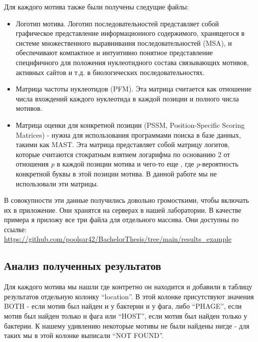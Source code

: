 \documentclass[14pt]{extarticle}
\begin{document}
    \par{Для каждого мотива также были получены следущие файлы: }
    
    \begin{itemize}
    \item Логотип мотива. Логотип последовательностей представляет собой графическое представление информационного
    содержимого, хранящегося в системе множественного выравнивания последовательностей (MSA), и обеспечивают
    компактное и интуитивно понятное представление специфичного для положения нуклеотидного состава связывающих
    мотивов, активных сайтов и т.д. в биологических последовательностях.
   
    \item Матрица частоты нуклеотидов (PFM). Эта матрица считается как отношение числа вхождений каждого нуклеотида в каждой позиции и полного числа мотивов. 
    
    \item Матрица оценки для конкретной позиции (PSSM, Position-Specific Scoring Matrices) - нужна для использования программами поиска в базе данных, такими как MAST. Эта матрица представляет собой матрицу логитов, которые считаются стократным взятием логарифма по основанию 2 от отношения \textit{p} в каждой позиции мотива и чего-то еще \cite{memeres}, где \textit{p}-вероятность конкретной буквы в этой позиции мотива. В данной работе мы не использовали эти матрицы.  
    \end{itemize}
    
    \par{В совокупности эти данные получились довольно громосткими, чтобы включать их в приложение. Они хранятся на серверах в нашей лаборатории. В качестве примера я приложу все три файла для отдельного массива. Они доступны по ссылке: \url{https://github.com/poolsar42/BachelorThesis/tree/main/results_example}}
    
    \begin{center}
    \subsection{Анализ полученных результатов}
    \end{center}
    
    \par{Для каждого мотива мы нашли где контретно он находится и добавили в таблицу результатов
    отдельную колонку ``location''. В этой колонке присутствуют значения BOTH - если мотив был найден и у бактерии и у
    фага, либо ``PHAGE'', если мотив был найден только и фага или ``HOST'', если мотив был найден только у бактерии. К
    нашему удивлению некоторые мотивы не были найдены нигде - для таких мы в этой колонке выписали ``NOT FOUND''.}
    
\end{document}
